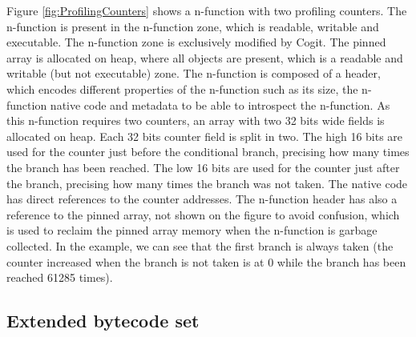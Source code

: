 \documentclass[a4paper,12pt,twoside]{../includes/ThesisStyle}
\begin{document}
Figure \ref{fig:ProfilingCounters} shows a n-function with two profiling counters. The n-function is present in the n-function zone, which is readable, writable and executable. The n-function zone is exclusively modified by Cogit. The pinned array is allocated on heap, where all objects are present, which is a readable and writable (but not executable) zone. The n-function is composed of a header, which encodes different properties of the n-function such as its size, the n-function native code and metadata to be able to introspect the n-function. As this n-function requires two counters, an array with two 32 bits wide fields is allocated on heap. Each 32 bits counter field is split in two. The high 16 bits are used for the counter just before the conditional branch, precising how many times the branch has been reached. The low 16 bits are used for the counter just after the branch, precising how many times the branch was not taken. The native code has direct references to the counter addresses. The n-function header has also a reference to the pinned array, not shown on the figure to avoid confusion, which is used to reclaim the pinned array memory when the n-function is garbage collected. In the example, we can see that the first branch is always taken (the counter increased when the branch is not taken is at 0 while the branch has been reached 61285 times).

\subsection{Extended bytecode set}
\end{document}
